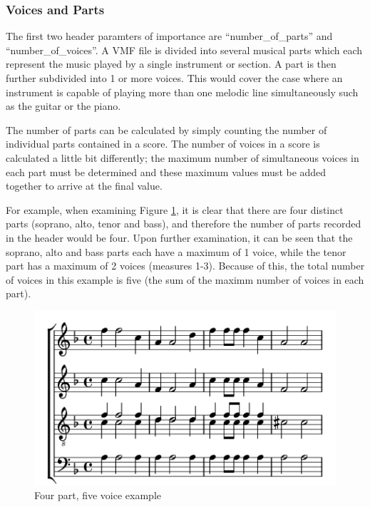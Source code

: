 \subsubsection{Voices and Parts}

The first two header paramters of importance are ``number\_of\_parts'' and ``number\_of\_voices''. A VMF file is divided into several musical parts which each represent the music played by a single instrument or section. A part is then further subdivided into 1 or more voices. This would cover the case where an instrument is capable of playing more than one melodic line simultaneously such as the guitar or the piano.

The number of parts can be calculated by simply counting the number of individual parts contained in a score. The number of voices in a score is calculated a little bit differently; the maximum number of simultaneous voices in each part must be determined and these maximum values must be added together to arrive at the final value.

For example, when examining Figure \ref{fig:voicesExample}, it is clear that there are four distinct parts (soprano, alto, tenor and bass), and therefore the number of parts recorded in the header would be four. Upon further examination, it can be seen that the soprano, alto and bass parts each have a maximum of 1 voice, while the tenor part has a maximum of 2 voices (measures 1-3). Because of this, the total number of voices in this example is five (the sum of the maximm number of voices in each part).

\begin{figure}
  \begin{center}
    \includegraphics[scale=0.75]{lilypond/voices}
    \caption{Four part, five voice example}
    \label{fig:voicesExample}
  \end{center}
\end{figure}


